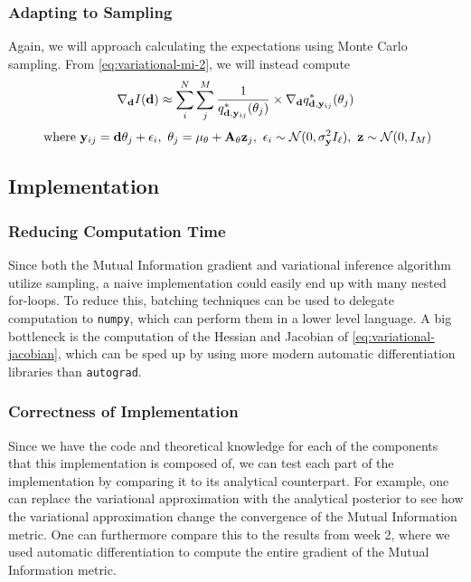 \subsubsection{Adapting to Sampling}
Again, we will approach calculating the expectations using Monte Carlo sampling. From \eqref{eq:variational-mi-2}, we will instead compute
\begin{equation}\nabla_{\mathbf{d}} I(\mathbf{d}) \approx \sum_{i}^N \sum_{j}^M \frac{1}{q^*_{\mathbf{d}, \mathbf{y}_{ij}}(\theta_{j})}\times \nabla_{\mathbf{d}}q^*_{\mathbf{d}, \mathbf{y}_{ij}}(\theta_{j})\end{equation}
$$\ \textrm{where}\ \B{y}_{ij} = \B{d}\theta_j + \epsilon_i,\ \theta_j = \mu_\theta + \B{A}_\theta\B{z}_j,\ \epsilon_i \sim \mathcal{N}(0, \sigma^2_\B{y} I_\ell),\ \B{z} \sim \mathcal{N}(0, I_M)$$

\subsection{Implementation}
\subsubsection{Reducing Computation Time}
Since both the Mutual Information gradient and variational inference algorithm utilize sampling, a naive implementation could easily end up with many nested for-loops.
To reduce this, batching techniques can be used to delegate computation to \texttt{numpy}, which can perform them in a lower level language. 
A big bottleneck is the computation of the Hessian and Jacobian of \eqref{eq:variational-jacobian}, which can be sped up by using more modern automatic differentiation libraries than \texttt{autograd}.
\subsubsection{Correctness of Implementation}
Since we have the code and theoretical knowledge for each of the components that this implementation is composed of, 
we can test each part of the implementation by comparing it to its analytical counterpart. 
For example, one can replace the variational approximation with the analytical posterior to see how the variational approximation change the convergence of the Mutual Information metric.
One can furthermore compare this to the results from week 2, where we used automatic differentiation to compute the entire gradient of the Mutual Information metric.
